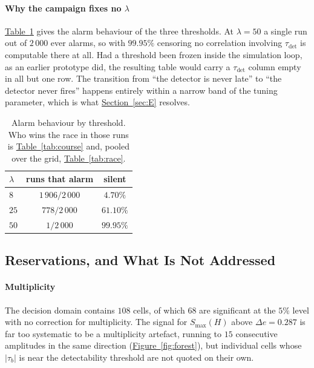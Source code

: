 \documentclass[10pt,conference]{IEEEtran}
\theoremstyle{definition}
\begin{document}
\paragraph{Why the campaign fixes no $\lambda$} \hyperref[tab:aveugle]{Table~\ref*{tab:aveugle}} gives the alarm
behaviour of the three thresholds. At $\lambda = 50$ a single run out of $2\,000$ ever
alarms, so with $99.95\%$ censoring no correlation involving $\tau_{\mathrm{det}}$ is
computable there at all. Had a threshold been frozen inside the simulation loop, as an
earlier prototype did, the resulting table would carry a $\tau_{\mathrm{det}}$ column empty
in all but one row. The transition from ``the detector is never late'' to ``the detector
never fires'' happens entirely within a narrow band of the tuning parameter, which is what
\hyperref[sec:E]{Section~\ref*{sec:E}} resolves.

\begin{table}[t]
  \centering
\caption{Alarm behaviour by threshold. Who wins the race in those runs is
  \hyperref[tab:course]{Table~\ref*{tab:course}} and, pooled over the grid, \hyperref[tab:race]{Table~\ref*{tab:race}}.}
\label{tab:aveugle}
  \begin{tabular}{lcc}
    \toprule
    $\lambda$ & runs that alarm & silent \\
    \midrule
    $8$  & $1\,906 / 2\,000$ & $4.70\%$ \\
    $25$ & $778 / 2\,000$    & $61.10\%$ \\
    $50$ & $1 / 2\,000$      & $99.95\%$ \\
    \bottomrule
  \end{tabular}

\end{table}

\subsection{Reservations, and What Is Not Addressed}

\paragraph{Multiplicity} The decision domain contains $108$ cells, of which $68$ are
significant at the $5\%$ level with no correction for multiplicity. The signal for
$S_{\max}(H)$ above $\Delta e = 0.287$ is far too systematic to be a multiplicity artefact,
running to $15$ consecutive amplitudes in the same direction
(\hyperref[fig:forest]{Figure~\ref*{fig:forest}}), but individual cells whose $|\tau_b|$ is near the detectability
threshold are not quoted on their own.
\end{document}
